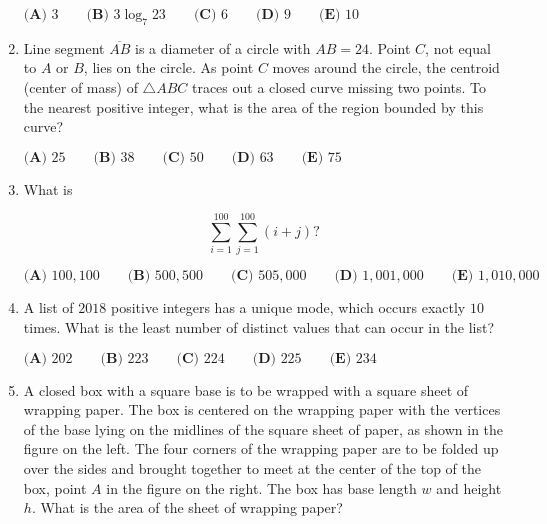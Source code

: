 \documentclass{article}
\begin{document}
\begin{enumerate}[label=\arabic*., itemsep=0.5em]
\(\textbf{(A) } 3 \qquad \textbf{(B) } 3\log_{7}23 \qquad \textbf{(C) } 6 \qquad \textbf{(D) } 9 \qquad \textbf{(E) } 10 \)\par \vspace{0.5em}\item Line segment \(\overline{AB}\) is a diameter of a circle with \(AB = 24\). Point \(C\), not equal to \(A\) or \(B\), lies on the circle. As point \(C\) moves around the circle, the centroid (center of mass) of \(\triangle ABC\) traces out a closed curve missing two points. To the nearest positive integer, what is the area of the region bounded by this curve?

\(\textbf{(A) } 25 \qquad \textbf{(B) } 38  \qquad \textbf{(C) } 50  \qquad \textbf{(D) } 63 \qquad \textbf{(E) } 75  \)\par \vspace{0.5em}\item What is

\begin{equation*}
\sum^{100}_{i=1} \sum^{100}_{j=1} (i+j) ?
\end{equation*}


\( \textbf{(A) }100{,}100 \qquad
\textbf{(B) }500{,}500\qquad
\textbf{(C) }505{,}000 \qquad
\textbf{(D) }1{,}001{,}000 \qquad
\textbf{(E) }1{,}010{,}000 \qquad \)\par \vspace{0.5em}\item A list of \(2018\) positive integers has a unique mode, which occurs exactly \(10\) times. What is the least number of distinct values that can occur in the list?

\( \textbf{(A) }202 \qquad
\textbf{(B) }223 \qquad
\textbf{(C) }224 \qquad
\textbf{(D) }225 \qquad
\textbf{(E) }234 \qquad \)\par \vspace{0.5em}\item A closed box with a square base is to be wrapped with a square sheet of wrapping paper. The box is centered on the wrapping paper with the vertices of the base lying on the midlines of the square sheet of paper, as shown in the figure on the left. The four corners of the wrapping paper are to be folded up over the sides and brought together to meet at the center of the top of the box, point \(A\) in the figure on the right. The box has base length \(w\) and height \(h\). What is the area of the sheet of wrapping paper?



\end{enumerate}
\end{document}
